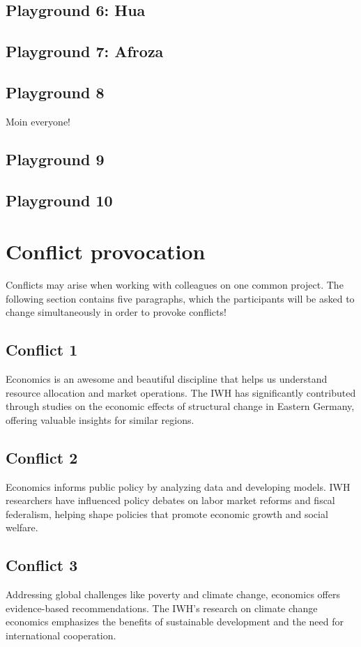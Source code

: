\documentclass{article}
\begin{document}
\subsection{Playground 6: Hua}

\subsection{Playground 7: Afroza}

\subsection{Playground 8}
Moin everyone!
\subsection{Playground 9}

\subsection{Playground 10}




\section{Conflict provocation}
Conflicts may arise when working with colleagues on one common project. The following section contains five paragraphs, which the participants will be asked to change simultaneously in order to provoke conflicts!

\subsection{Conflict 1}
Economics is an awesome and beautiful discipline that helps us understand resource allocation and market operations. The IWH has significantly contributed through studies on the economic effects of structural change in Eastern Germany, offering valuable insights for similar regions.

\subsection{Conflict 2}
Economics informs public policy by analyzing data and developing models. IWH researchers have influenced policy debates on labor market reforms and fiscal federalism, helping shape policies that promote economic growth and social welfare.

\subsection{Conflict 3}
Addressing global challenges like poverty and climate change, economics offers evidence-based recommendations. The IWH's research on climate change economics emphasizes the benefits of sustainable development and the need for international cooperation.
\end{document}
